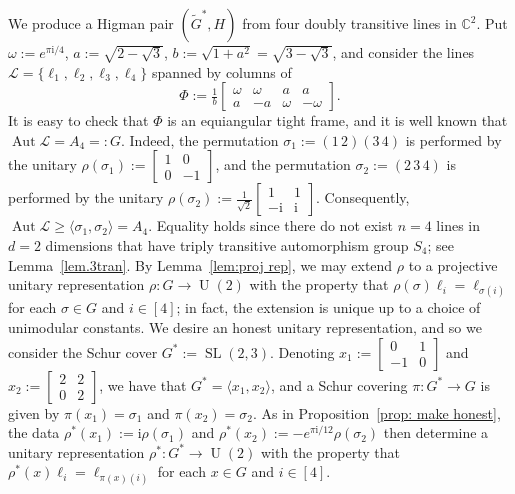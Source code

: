 \begin{example}
\label{ex:Higman pair from 2x4}
We produce a Higman pair $(\tilde{G}^*,H)$ from four doubly transitive lines in $\mathbb{C}^2$.
Put $\omega := e^{\pi \mathrm{i}/4}$, $a := \sqrt{2 - \sqrt{3}}$, $b:=\sqrt{1+a^2} = \sqrt{3-\sqrt{3}}$, and consider the lines $\mathscr{L} = \{\ell_1,\ell_2,\ell_3,\ell_4\}$ spanned by columns of
\[
\Phi := \tfrac{1}{b}\left[ \begin{array}{rrrr}
\omega & \omega & a & a \\
a & -a & \omega & - \omega
\end{array} \right].
\]
It is easy to check that $\Phi$ is an equiangular tight frame, and it is well known that $\operatorname{Aut} \mathscr{L} = A_4 =: G$.
Indeed, the permutation $\sigma_1 := (1\, 2)(3\, 4)$ is performed by the unitary $\rho(\sigma_1):=\left[ \begin{smallmatrix} 1 & 0 \\ 0 & -1 \end{smallmatrix} \right]$, and the permutation $\sigma_2 := (2\, 3\, 4)$ is performed by the unitary $\rho(\sigma_2):=\tfrac{1}{\sqrt{2}} \left[ \begin{smallmatrix} 1 & 1 \\ -\mathrm{i} & \mathrm{i} \end{smallmatrix} \right]$.
Consequently, $\operatorname{Aut} \mathscr{L} \geq \langle \sigma_1,\sigma_2 \rangle = A_4$.
Equality holds since there do not exist $n=4$ lines in $d=2$ dimensions that have triply transitive automorphism group $S_4$; see Lemma~\ref{lem.3tran}.
By Lemma~\ref{lem:proj rep}, we may extend $\rho$ to a projective unitary representation $\rho \colon G \to \operatorname{U}(2)$ with the property that $\rho(\sigma) \ell_i = \ell_{\sigma(i)}$ for each $\sigma \in G$ and $i \in [4]$; in fact, the extension is unique up to a choice of unimodular constants.
We desire an honest unitary representation, and so we consider the Schur cover $G^*:= \operatorname{SL}(2,3)$.
Denoting $x_1:= \left[ \begin{smallmatrix} 0 & 1 \\ -1 & 0 \end{smallmatrix} \right]$ and $x_2 := \left[ \begin{smallmatrix} 2 & 2 \\ 0 & 2 \end{smallmatrix} \right]$, we have that $G^*=\langle x_1,x_2\rangle$, and a Schur covering $\pi \colon G^* \to G$ is given by $\pi(x_1) = \sigma_1$ and $\pi(x_2) = \sigma_2$.
As in Proposition~\ref{prop: make honest}, the data $\rho^*(x_1):=\mathrm{i} \rho(\sigma_1)$ and $\rho^*(x_2):= -e^{\pi \mathrm{i}/12} \rho(\sigma_2)$ then determine a unitary representation $\rho^* \colon G^* \to \operatorname{U}(2)$ with the property that $\rho^*(x) \ell_i = \ell_{\pi(x)(i)}$ for each $x \in G$ and $i \in [4]$.


\end{example}
